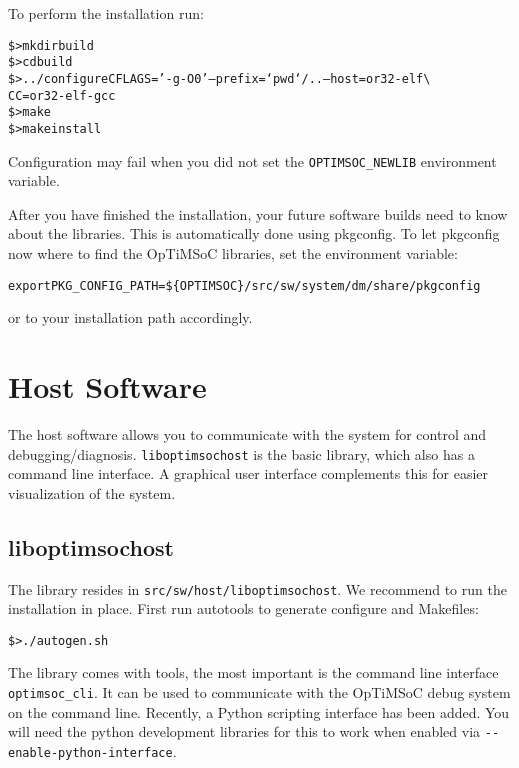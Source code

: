 To perform the installation run:

\begin{alltt}
\$> mkdir build
\$> cd build
\$> ../configure CFLAGS='-g -O0' --prefix=`pwd`/.. --host=or32-elf \textbackslash
    CC=or32-elf-gcc
\$> make
\$> make install
\end{alltt}

Configuration may fail when you did not set the \verb|OPTIMSOC_NEWLIB|
environment variable.

After you have finished the installation, your future software builds
need to know about the libraries. This is automatically done using
pkgconfig. To let pkgconfig now where to find the OpTiMSoC libraries,
set the environment variable:

\begin{alltt}
export PKG_CONFIG_PATH=\$\{OPTIMSOC\}/src/sw/system/dm/share/pkgconfig
\end{alltt}

or to your installation path accordingly.

\section{Host Software}

The host software allows you to communicate with the system for
control and debugging/diagnosis. \verb|liboptimsochost| is the basic
library, which also has a command line interface. A graphical user
interface complements this for easier visualization of the system.

\subsection{liboptimsochost}

The library resides in \verb|src/sw/host/liboptimsochost|. We
recommend to run the installation in place. First run autotools to
generate configure and Makefiles:

\begin{alltt}
\$> ./autogen.sh
\end{alltt}

The library comes with tools, the most important is the command
line interface \verb|optimsoc_cli|. It can be used to communicate with
the OpTiMSoC debug system on the command line. Recently, a Python
scripting interface has been added. You will need the python
development libraries for this to work when enabled via
\verb|--enable-python-interface|.

